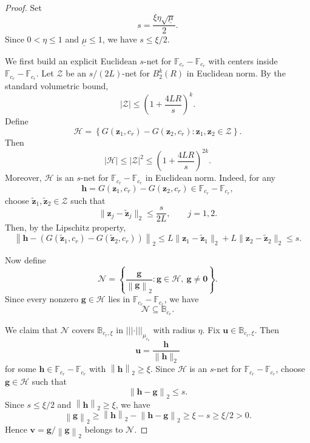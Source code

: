 \documentclass{article}
\theoremstyle{plain}
\theoremstyle{definition}
\theoremstyle{remark}
\newcommand*{\snorm}[2]{\left\vert\!\left\vert\!\left\vert #1 \right\vert\!\right\vert\!\right\vert_{#2}}
\begin{document}
\begin{proof}
  Set
  \[
    s=\frac{\xi\eta\sqrt{\underline{\mu}}}{2}.
  \]
  Since $0<\eta\leq 1$ and $\underline{\mu}\leq 1$, we have
  $s\leq \xi/2$.

  We first build an explicit Euclidean $s$-net for
  $\mathbb F_{c_r}-\mathbb F_{c_r}$ with centers inside
  $\mathbb F_{c_r}-\mathbb F_{c_r}$. Let $\mathcal Z$ be an
  $s/(2L)$-net for $B_2^k(R)$ in Euclidean norm. By the standard
  volumetric bound,
  \[
    |\mathcal Z|
    \leq
    \left(
      1+
      \frac{4LR}{s}
    \right)^k.
  \]
  Define
  \[
    \mathcal H
    =
    \left\{
      G(\mathbf z_1,c_r)-G(\mathbf z_2,c_r)
      :
      \mathbf z_1,\mathbf z_2\in\mathcal Z
    \right\}.
  \]
  Then
  \[
    |\mathcal H|
    \leq
    |\mathcal Z|^2
    \leq
    \left(
      1+
      \frac{4LR}{s}
    \right)^{2k}.
  \]
  Moreover, $\mathcal H$ is an $s$-net for
  $\mathbb F_{c_r}-\mathbb F_{c_r}$ in Euclidean norm. Indeed, for any
  \[
    \mathbf h
    =
    G(\mathbf z_1,c_r)-G(\mathbf z_2,c_r)
    \in
    \mathbb F_{c_r}-\mathbb F_{c_r},
  \]
  choose $\tilde{\mathbf z}_1,\tilde{\mathbf z}_2\in\mathcal Z$ such that
  \[
    \|\mathbf z_j-\tilde{\mathbf z}_j\|_2
    \leq
    \frac{s}{2L},
    \qquad
    j=1,2.
  \]
  Then, by the Lipschitz property,
  \[
    \left\|
      \mathbf h
      -
      \left(
        G(\tilde{\mathbf z}_1,c_r)
        -
        G(\tilde{\mathbf z}_2,c_r)
      \right)
    \right\|_2
    \leq
    L\|\mathbf z_1-\tilde{\mathbf z}_1\|_2
    +
    L\|\mathbf z_2-\tilde{\mathbf z}_2\|_2
    \leq
    s.
  \]

  Now define
  \[
    \mathcal N
    =
    \left\{
      \frac{\mathbf g}{\left\|\mathbf g\right\|_2}
      :
      \mathbf g\in\mathcal H,\ \mathbf g\neq \mathbf 0
    \right\}.
  \]
  Since every nonzero $\mathbf g\in\mathcal H$ lies in
  $\mathbb F_{c_r}-\mathbb F_{c_r}$, we have
  \[
    \mathcal N\subseteq\mathbb B_{c_r}.
  \]

  We claim that $\mathcal N$ covers $\mathbb B_{c_r,\xi}$ in
  $\snorm{\cdot}{\mu_{c_s}}$ with radius $\eta$. Fix
  $\mathbf u\in\mathbb B_{c_r,\xi}$. Then
  \[
    \mathbf u=\frac{\mathbf h}{\|\mathbf h\|_2}
  \]
  for some $\mathbf h\in\mathbb F_{c_r}-\mathbb F_{c_r}$ with
  $\left\|\mathbf h \right\|_2\geq \xi$. Since $\mathcal H$ is an $s$-net for
  $\mathbb F_{c_r}-\mathbb F_{c_r}$, choose $\mathbf g\in\mathcal H$ such
  that
  \[
    \left\|\mathbf h-\mathbf g\right\|_2\leq s.
  \]
  Since $s\leq \xi/2$ and $\left\|\mathbf h\right\|_2\geq\xi$, we have
  \[
    \left\|\mathbf g\right\|_2
    \geq
    \left\|\mathbf h\right\|_2-\left\|\mathbf h-\mathbf g\right\|_2
    \geq
    \xi-s
    \geq
    \xi/2
    >
    0.
  \]
  Hence $\mathbf v=\mathbf g/\left\|\mathbf g\right\|_2$ belongs to $\mathcal N$.
  

\end{proof}
\end{document}
